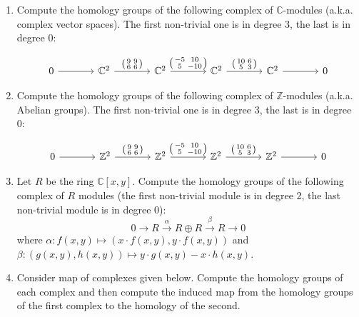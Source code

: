 \documentclass[12pt]{article}
\newcommand{\ZZ}{\mathbb{Z}}
\newcommand{\CC}{\mathbb{C}}
\begin{document}
\begin{enumerate}
\item Compute the homology groups of the following complex of
$\CC$-modules (a.k.a. complex vector spaces). The first non-trivial
one is in degree 3, the last is in degree 0:

\[
\begin{tikzcd}[column sep=large,ampersand replacement=\&]
0 \arrow{r} \&
\CC^{2} \arrow{r}{
 \left( \begin{smallmatrix} 9 & 9 \\ 6 & 6 \end{smallmatrix}  \right) } \& 
\CC^{2} \arrow{r}{ \left( \begin{smallmatrix} -5 & 10 \\ 5 & -10 \end{smallmatrix}  \right) } \& 
\CC^{2} \arrow{r}{  \left( \begin{smallmatrix} 10 & 6 \\ 5 & 3 \end{smallmatrix} \right) } \&
\CC^{2} \arrow{r} \& 0 
\end{tikzcd}
\]
\item Compute the homology groups of the following complex of
$\ZZ $-modules (a.k.a. Abelian groups). The first non-trivial
one is in degree 3, the last is in degree 0:

\[
\begin{tikzcd}[column sep=large,ampersand replacement=\&]
0 \arrow{r} \&
\ZZ^{2} \arrow{r}{
 \left( \begin{smallmatrix} 9 & 9 \\ 6 & 6 \end{smallmatrix}  \right) } \& 
\ZZ^{2} \arrow{r}{ \left( \begin{smallmatrix} -5 & 10 \\ 5 & -10 \end{smallmatrix}  \right) } \& 
\ZZ^{2} \arrow{r}{  \left( \begin{smallmatrix} 10 & 6 \\ 5 & 3 \end{smallmatrix} \right) } \&
\ZZ^{2} \arrow{r} \& 0 
\end{tikzcd}
\]


\item Let $R$ be the ring $\CC [x,y]$. Compute
the homology groups of the following complex of $R$ modules
(the first non-trivial module is in degree 2, the last non-trivial
module is in degree 0):
\[
0\to R \xrightarrow{\,\, \alpha  \,\,}  R\oplus R \xrightarrow{\,\, \beta  \,\,}
R   \to 0
\]
where $\alpha : f(x,y)\mapsto (x\cdot f(x,y),y\cdot f(x,y))$ and
$\beta : (g(x,y),h(x,y)) \mapsto y\cdot g(x,y)- x\cdot h(x,y)$.  
\item
Consider map of complexes given below. Compute the homology groups of
each complex and then compute the induced map from the homology groups
of the first complex to the homology of the second.


\end{enumerate}
\end{document}
